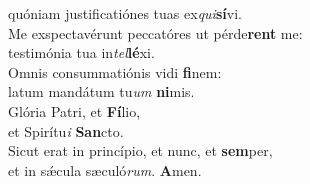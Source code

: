 \evenverse quóniam justificatiónes tuas ex\textit{qui}\textbf{sí}vi.\\
\oddverse Me exspectavérunt peccatóres ut pérde\textbf{rent} me:~\*\\
\oddverse testimónia tua in\textit{tel}\textbf{lé}xi.\\
\evenverse Omnis consummatiónis vidi \textbf{fi}nem:~\*\\
\evenverse latum mandátum tu\textit{um} \textbf{ni}mis.\\
\oddverse Glória Patri, et \textbf{Fí}lio,~\*\\
\oddverse et Spirítu\textit{i} \textbf{San}cto.\\
\evenverse Sicut erat in princípio, et nunc, et \textbf{sem}per,~\*\\
\evenverse et in sǽcula sæculó\textit{rum}. \textbf{A}men.\\
